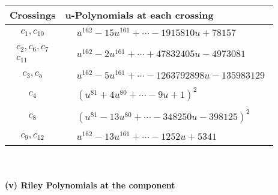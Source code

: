 \documentclass[1p]{elsarticle_modified}
\theoremstyle{definition}
\begin{document}
\begin{tabular}{m{50pt}|m{274pt}}
Crossings & \hspace{64pt}u-Polynomials at each crossing \\
\hline $$\begin{aligned}c_{1},c_{10}\end{aligned}$$&$\begin{aligned}
&u^{162}-15 u^{161}+\cdots-1915810 u+78157
\end{aligned}$\\
\hline $$\begin{aligned}c_{2},c_{6},c_{7}\\c_{11}\end{aligned}$$&$\begin{aligned}
&u^{162}-2 u^{161}+\cdots+47832405 u-4973081
\end{aligned}$\\
\hline $$\begin{aligned}c_{3},c_{5}\end{aligned}$$&$\begin{aligned}
&u^{162}-5 u^{161}+\cdots-1263792898 u-135983129
\end{aligned}$\\
\hline $$\begin{aligned}c_{4}\end{aligned}$$&$\begin{aligned}
&(u^{81}+4 u^{80}+\cdots-9 u+1)^{2}
\end{aligned}$\\
\hline $$\begin{aligned}c_{8}\end{aligned}$$&$\begin{aligned}
&(u^{81}-13 u^{80}+\cdots-348250 u-398125)^{2}
\end{aligned}$\\
\hline $$\begin{aligned}c_{9},c_{12}\end{aligned}$$&$\begin{aligned}
&u^{162}-13 u^{161}+\cdots-1252 u+5341
\end{aligned}$\\
\hline
\end{tabular}\\~\\
\newpage\renewcommand{\arraystretch}{1}
\flushleft \textbf{(v) Riley Polynomials at the component}\newline \\
\end{document}
